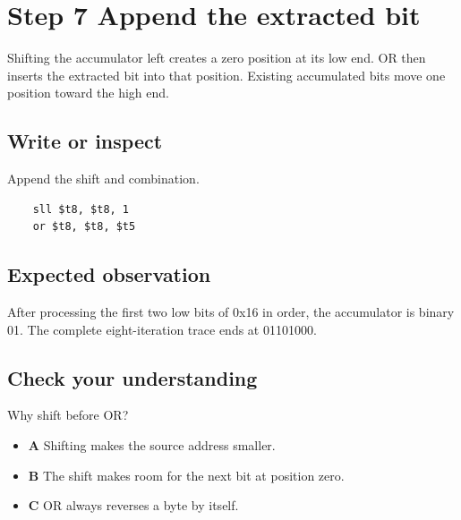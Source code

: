 \section{Step 7 Append the extracted
  bit}\label{003-eight-byte-sprite-s07-step-7-append-the-extracted-bit}

Shifting the accumulator left creates a zero position at its low end. OR
then inserts the extracted bit into that position. Existing accumulated
bits move one position toward the high end.

\subsection{Write or
  inspect}\label{003-eight-byte-sprite-s07-write-or-inspect}

Append the shift and combination.

\begin{verbatim}
    sll $t8, $t8, 1
    or $t8, $t8, $t5
\end{verbatim}

\subsection{Expected
  observation}\label{003-eight-byte-sprite-s07-expected-observation}

After processing the first two low bits of 0x16 in order, the
accumulator is binary 01. The complete eight-iteration trace ends at
01101000.

\subsection{Check your
  understanding}\label{003-eight-byte-sprite-s07-check-your-understanding}

Why shift before OR?

\begin{itemize}
  \tightlist
  \item
        \textbf{A} Shifting makes the source address smaller.
  \item
        \textbf{B} The shift makes room for the next bit at position zero.
  \item
        \textbf{C} OR always reverses a byte by itself.
\end{itemize}
